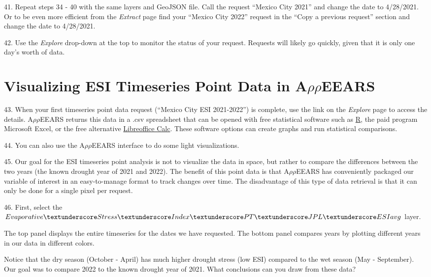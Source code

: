 \documentclass[oneside,a4paper,11pt,explicit]{book}
\begin{document}
41. Repeat steps 34 - 40 with the same layers and GeoJSON file. Call the request ``Mexico City 2021'' and change the date to 4/28/2021. Or to be even more efficient from the \textit{Extract} page find your ``Mexico City 2022'' request in the ``Copy a previous request'' section and change the date to 4/28/2021.

42. Use the \textit{Explore} drop-down at the top to monitor the status of your request. Requests will likely go quickly, given that it is only one day's worth of data.

\section{Visualizing ESI Timeseries Point Data in A$\rho\rho$EEARS}

43. When your first timeseries point data request (``Mexico City ESI 2021-2022'') is complete, use the link on the \textit{Explore} page to access the details. A$\rho\rho$EEARS returns this data in a .csv spreadsheet that can be opened with free statistical software such as \href{https://www.r-project.org/about.html}{R}, the paid program Microsoft Excel, or the free alternative \href{https://www.libreoffice.org/}{Libreoffice Calc}. These software options can create graphs and run statistical comparisons. 

44. You can also use the A$\rho\rho$EEARS interface to do some light visualizations.

45. Our goal for the ESI timeseries point analysis is not to visualize the data in space, but rather to compare the differences between the two years (the known drought year of 2021 and 2022). The benefit of this point data is that A$\rho\rho$EEARS has conveniently packaged our variable of interest in an easy-to-manage format to track changes over time. The disadvantage of this type of data retrieval is that it can only be done for a single pixel per request. 

46. First, select the $Evaporative\textunderscore Stress\textunderscore Index\textunderscore PT\textunderscore JPL\textunderscore ESIavg$ layer.


The top panel displays the entire timeseries for the dates we have requested. The bottom panel compares years by plotting different years in our data in different colors. 

\vspace{.5em}

Notice that the dry season (October - April) has much higher drought stress (low ESI) compared to the wet season (May - September). Our goal was to compare 2022 to the known drought year of 2021. What conclusions can you draw from these data? 
\end{document}

